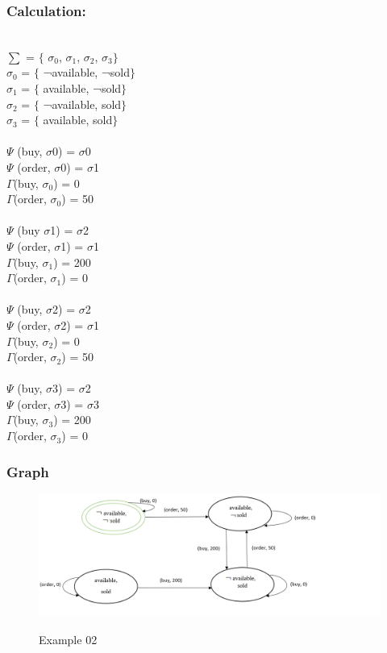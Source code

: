 \documentclass[11pt]{article}
\begin{document}
	\subsubsection{Calculation:}\label{par:p302}
	\indent \\
	$ \sum $ = $ \{ $ $ \sigma _{0}$, $ \sigma _{1}$, $ \sigma _{2}$, $ \sigma _{3}$$ \} $ \\
	$ \sigma _{0}$ = $ \{ $ ¬available, ¬sold$ \} $ \\
	$ \sigma _{1}$ = $ \{ $ available, ¬sold$ \} $ \\
	$ \sigma _{2}$ = $ \{ $ ¬available, sold$ \} $ \\
	$ \sigma _{3}$ = $ \{ $ available, sold$ \} $ \\
	\\
	\(  \Psi  \)  (buy, $ \sigma $0) = $ \sigma $0\\
	\(  \Psi  \)  (order, $ \sigma $0) = $ \sigma $1\\
	\(\Gamma\)(buy, $\sigma_{0}$) = 0\\
	\(\Gamma\)(order, $\sigma_{0}$) = 50\\
	\\
	\(  \Psi  \)  (buy $ \sigma $1) = $ \sigma $2\\
	\(  \Psi  \)  (order, $ \sigma $1) = $ \sigma $1\\
	\(\Gamma\)(buy, $\sigma_{1}$) = 200\\
	\(\Gamma\)(order, $\sigma_{1}$) = 0\\
	\\
	\(  \Psi  \)  (buy, $ \sigma $2) = $ \sigma $2\\
	\(  \Psi  \)  (order, $ \sigma $2) = $ \sigma $1\\
	\(\Gamma\)(buy, $\sigma_{2}$) = 0\\
	\(\Gamma\)(order, $\sigma_{2}$) = 50\\
	\\
	\(  \Psi  \)  (buy, $ \sigma $3) = $ \sigma $2\\
	\(  \Psi  \)  (order, $ \sigma $3) = $ \sigma $3\\
	\(\Gamma\)(buy, $\sigma_{3}$) = 200\\
	\(\Gamma\)(order, $\sigma_{3}$) = 0\\

	\subsubsection{Graph}\label{par:p402}
	\begin{figure}[H]
		\includegraphics[width=1.2\linewidth, height=0.4\textheight]{./media/example2_graph.png}
		\label{Figure:f02}
		\caption{Example 02}
	\end{figure}
\end{document}

